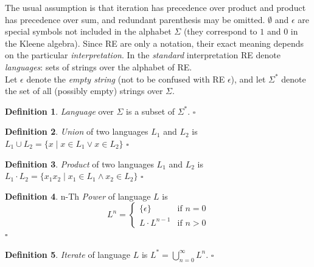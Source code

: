 \documentclass{article}
\newcommand{\Xin}{\!\in\!}
\newcommand{\Xeq}{\!=\!}
\theoremstyle{definition}
\newtheorem{Xdef}{Definition}
\begin{document}
\begin{multicols}{2}
The usual assumption is that iteration has precedence over product and product has precedence over sum,
and redundant parenthesis may be omitted.
$\emptyset$ and $\epsilon$ are special symbols not included in the alphabet $\Sigma$ (they correspond to $1$ and $0$ in the Kleene algebra).
Since RE are only a notation, their exact meaning depends on the particular \emph{interpretation}.
In the \emph{standard} interpretation RE denote \emph{languages}: sets of strings over the alphabet of RE.
\\

Let $\epsilon$ denote the \emph{empty string} (not to be confused with RE $\epsilon$),
and let $\Sigma^*$ denote the set of all (possibly empty) strings over $\Sigma$.

    \begin{Xdef}
    \emph{Language} over $\Sigma$ is a subset of $\Sigma^*$.
    $\square$
    \end{Xdef}

    \begin{Xdef}\label{langunion}
    \emph{Union} of two languages $L_1$ and $L_2$ is
    $L_1 \cup L_2 = \{ x \mid x \Xin L_1 \vee x \Xin L_2 \}$
    $\square$
    \end{Xdef}

    \begin{Xdef}\label{langproduct}
    \emph{Product} of two languages $L_1$ and $L_2$ is
    $L_1 \cdot L_2 = \{ x_1 x_2 \mid x_1 \Xin L_1 \wedge x_2 \Xin L_2 \}$
    $\square$
    \end{Xdef}

    \begin{Xdef}\label{langiterate}
    n-Th \emph{Power} of language $L$ is
    $$L^n = \begin{cases}
            \{ \epsilon \} & \text{if } n \Xeq 0 \\[-0.5em]
            L \cdot L^{n - 1} & \text{if } n\!>\!0
        \end{cases}$$
    $\square$
    \end{Xdef}

    \begin{Xdef}\label{langiterate}
    \emph{Iterate} of language $L$ is
    $L^* = \bigcup\limits_{n = 0}^\infty L^n$.
    $\square$
    \end{Xdef}


\end{multicols}
\end{document}
